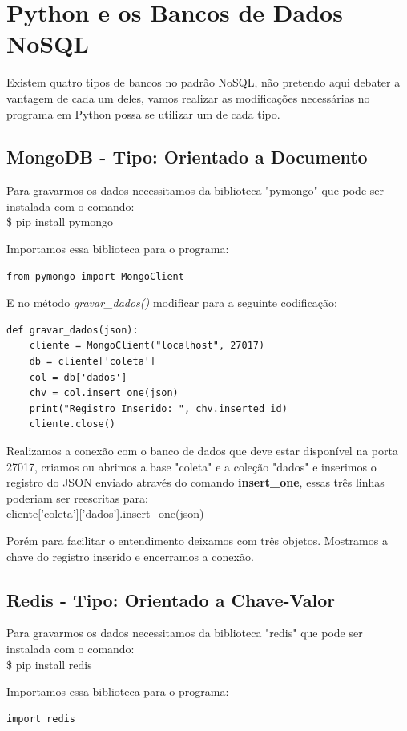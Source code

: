 \documentclass[a4paper,11pt]{article}
\begin{document}
\section*{Python e os Bancos de Dados NoSQL}
Existem quatro tipos de bancos no padrão NoSQL, não pretendo aqui debater a vantagem de cada um deles, vamos realizar as modificações necessárias no programa em Python possa se utilizar um de cada tipo.

\subsection*{MongoDB - Tipo: Orientado a Documento}
Para gravarmos os dados necessitamos da biblioteca "pymongo" que pode ser instalada com o comando: \\
{\ttfamily\$ pip install pymongo}

Importamos essa biblioteca para o programa:
\begin{lstlisting}[]
from pymongo import MongoClient
\end{lstlisting}

E no método \textit{gravar\_dados()} modificar para a seguinte codificação:
\begin{lstlisting}[]
  def gravar_dados(json):
    cliente = MongoClient("localhost", 27017)
    db = cliente['coleta']
    col = db['dados']
    chv = col.insert_one(json)
    print("Registro Inserido: ", chv.inserted_id)
    cliente.close()	
\end{lstlisting}

Realizamos a conexão com o banco de dados que deve estar disponível na porta 27017, criamos ou abrimos a base "coleta" e a coleção "dados" e inserimos o registro do JSON enviado através do comando \textbf{insert\_one}, essas três linhas poderiam ser reescritas para: \\
{\ttfamily cliente['coleta']['dados'].insert\_one(json)}

Porém para facilitar o entendimento deixamos com três objetos. Mostramos a chave do registro inserido e encerramos a conexão.

\subsection*{Redis - Tipo: Orientado a Chave-Valor}
Para gravarmos os dados necessitamos da biblioteca "redis" que pode ser instalada com o comando: \\
{\ttfamily\$ pip install redis}

Importamos essa biblioteca para o programa:
\begin{lstlisting}[]
import redis
\end{lstlisting}
\end{document}
